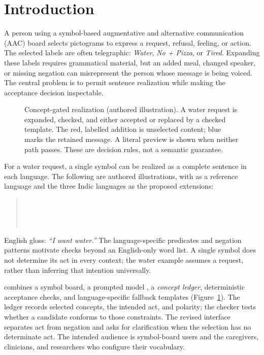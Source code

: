 \section{Introduction}
\label{sec:intro}
A person using a symbol-based augmentative and alternative communication (AAC) board selects pictograms to express a request, refusal, feeling, or action.
The selected labels are often telegraphic: \emph{Water}, \emph{No + Pizza}, or \emph{Tired}.
Expanding these labels requires grammatical material, but an added meal, changed speaker, or missing negation can misrepresent the person whose message is being voiced.
The central problem is to permit sentence realization while making the acceptance decision inspectable.

\begin{figure}[t]
\centering

\caption{Concept-gated realization (authored illustration). A water request is expanded, checked, and either accepted or replaced by a checked template. The red, labelled addition is unselected content; blue marks the retained message. A literal preview is shown when neither path passes. These are decision rules, not a semantic guarantee.}
\label{fig:teaser}
\end{figure}

For a water request, a single symbol can be realized as a complete sentence in each language.
The following are authored illustrations, with  as a reference language and the three Indic languages as the proposed extensions:
\begin{quote}\small
{}\enspace{}\\
\enspace{}\\
\enspace{}\\
\enspace{}
\end{quote}
\noindent English gloss: \emph{“I want water.”}
The language-specific predicates and negation patterns motivate checks beyond an English-only word list.
A single symbol does not determine its act in every context; the water example assumes a request, rather than inferring that intention universally.

\sys{} combines a symbol board, a prompted \emph{\model{}} model \citep{qwen2024model}, a \emph{concept ledger}, deterministic acceptance checks, and language-specific fallback templates (Figure~\ref{fig:teaser}).
The ledger records selected concepts, the intended act, and polarity; the checker tests whether a candidate conforms to those constraints.
The revised interface separates act from negation and asks for clarification when the selection has no determinate act.
The intended audience is symbol-board users and the caregivers, clinicians, and researchers who configure their vocabulary.

